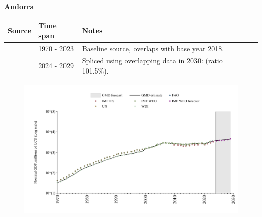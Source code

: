 \documentclass[12pt,a4paper,landscape]{article}
\begin{document}
\begin{adjustbox}{max totalsize={\paperwidth}{\paperheight},center}
\begin{minipage}[t][\textheight][t]{\textwidth}
\vspace*{0.5cm}
{}
\begin{center}
{\Large\bfseries Andorra}
\end{center}
\vspace{0.5cm}
\begin{table}[H]
\centering
\small
\begin{tabular}{|l|l|l|}
\hline
\textbf{Source} & \textbf{Time span} & \textbf{Notes} \\
\hline
\rowcolor{white}\cite{WDI}& 1970 - 2023 &Baseline source, overlaps with base year 2018.\\
\rowcolor{lightgray}\cite{IMF_WEO_forecast}& 2024 - 2029 &Spliced using overlapping data in 2030: (ratio = 101.5\%).\\
\hline
\end{tabular}
\end{table}
\begin{figure}[H]
\centering
\includegraphics[width=\textwidth,height=0.6\textheight,keepaspectratio]{graphs/AND_nGDP.pdf}
\end{figure}
\end{minipage}
\end{adjustbox}
\end{document}
